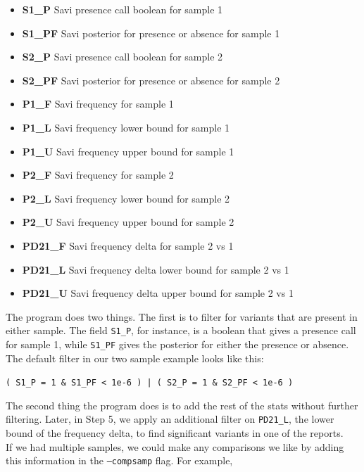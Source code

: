 \documentclass[letterpaper,14pt]{memoir}
\begin{document}
\begin{itemize}
\tightlist
\item
  \textbf{S1\_P} Savi presence call boolean for sample 1
\item
  \textbf{S1\_PF} Savi posterior for presence or absence for sample 1
\item
  \textbf{S2\_P} Savi presence call boolean for sample 2
\item
  \textbf{S2\_PF} Savi posterior for presence or absence for sample 2
\item
  \textbf{P1\_F} Savi frequency for sample 1
\item
  \textbf{P1\_L} Savi frequency lower bound for sample 1
\item
  \textbf{P1\_U} Savi frequency upper bound for sample 1
\item
  \textbf{P2\_F} Savi frequency for sample 2
\item
  \textbf{P2\_L} Savi frequency lower bound for sample 2
\item
  \textbf{P2\_U} Savi frequency upper bound for sample 2
\item
  \textbf{PD21\_F} Savi frequency delta for sample 2 vs 1
\item
  \textbf{PD21\_L} Savi frequency delta lower bound for sample 2 vs 1
\item
  \textbf{PD21\_U} Savi frequency delta upper bound for sample 2 vs 1
\end{itemize}

\noindent The program does two things. The first is to filter for variants that are present in either sample. The field \texttt{S1\_P}, for instance, is a boolean that gives a presence call for sample 1, while \texttt{S1\_PF} gives the posterior for either the presence or absence.
The default filter in our two sample example looks like this:

\begin{center}
\texttt{( S1\_P = 1 \& S1\_PF < 1e-6 ) | ( S2\_P = 1 \& S2\_PF < 1e-6 )}
\end{center}

\noindent The second thing the program does is to add the rest of the stats without further filtering. Later, in Step 5, we apply an additional filter on \texttt{PD21\_L}, the lower bound of the frequency delta, to find significant variants in one of the reports.\\

\noindent If we had multiple samples, we could make any comparisons we like by adding this information in the \texttt{--compsamp} flag. For example, 
\end{document}
